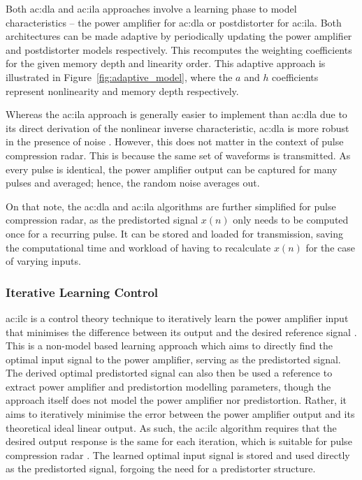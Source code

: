 Both \gls{ac:dla} and \gls{ac:ila} approaches involve a learning phase to model characteristics -- the power amplifier for \gls{ac:dla} or postdistorter for \gls{ac:ila}. Both architectures can be made adaptive by periodically updating the power amplifier and postdistorter models respectively. This recomputes the weighting coefficients for the given memory depth and linearity order. This adaptive approach is illustrated in Figure~\ref{fig:adaptive_model}, where the $a$ and $h$ coefficients represent nonlinearity and memory depth respectively.

Whereas the \gls{ac:ila} approach is generally easier to implement than \gls{ac:dla} due to its direct derivation of the nonlinear inverse characteristic, \gls{ac:dla} is more robust in the presence of noise \cite{abihussein2012}. However, this does not matter in the context of pulse compression radar. This is because the same set of waveforms is transmitted. As every pulse is identical, the power amplifier output can be captured for many pulses and averaged; hence, the random noise averages out. 

On that note, the \gls{ac:dla} and \gls{ac:ila} algorithms are further simplified for pulse compression radar, as the predistorted signal $x(n)$ only needs to be computed once for a recurring pulse. It can be stored and loaded for transmission, saving the computational time and workload of having to recalculate $x(n)$ for the case of varying inputs.  

\subsubsection{Iterative Learning Control}\label{sec:iterative_learning_control}

\gls{ac:ilc} is a control theory technique to iteratively learn the power amplifier input that minimises the difference between its output and the desired reference signal \cite{chanicahuana}. This is a non-model based learning approach which aims to directly find the optimal input signal to the power amplifier, serving as the predistorted signal. The derived optimal predistorted signal can also then be used a reference to extract power amplifier and predistortion modelling parameters, though the approach itself does not model the power amplifier nor predistortion. Rather, it aims to iteratively minimise the error between the power amplifier output and its theoretical ideal linear output. As such, the \gls{ac:ilc} algorithm requires that the desired output response is the same for each iteration, which is suitable for pulse compression radar \cite{hanning}. The learned optimal input signal is stored and used directly as the predistorted signal, forgoing the need for a predistorter structure. 

